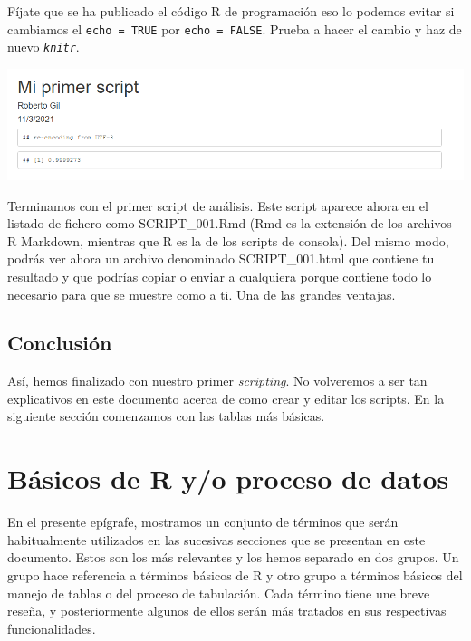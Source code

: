 \documentclass[
]{book}
\begin{document}
Fíjate que se ha publicado el código R de programación eso lo podemos evitar si cambiamos el \texttt{echo\ =\ TRUE} por \texttt{echo\ =\ FALSE}. Prueba a hacer el cambio y haz de nuevo \emph{\texttt{knitr}}.

\includegraphics{data/RS13.png}

Terminamos con el primer script de análisis. Este script aparece ahora en el listado de fichero como SCRIPT\_001.Rmd (Rmd es la extensión de los archivos R Markdown, mientras que R es la de los scripts de consola). Del mismo modo, podrás ver ahora un archivo denominado SCRIPT\_001.html que contiene tu resultado y que podrías copiar o enviar a cualquiera porque contiene todo lo necesario para que se muestre como a ti. Una de las grandes ventajas.

\hypertarget{conclusiuxf3n}{%
\subsection{Conclusión}\label{conclusiuxf3n}}

Así, hemos finalizado con nuestro primer \emph{scripting}. No volveremos a ser tan explicativos en este documento acerca de como crear y editar los scripts. En la siguiente sección comenzamos con las tablas más básicas.

\hypertarget{buxe1sicos-de-r-yo-proceso-de-datos}{%
\section{Básicos de R y/o proceso de datos}\label{buxe1sicos-de-r-yo-proceso-de-datos}}

En el presente epígrafe, mostramos un conjunto de términos que serán habitualmente utilizados en las sucesivas secciones que se presentan en este documento. Estos son los más relevantes y los hemos separado en dos grupos. Un grupo hace referencia a términos básicos de R y otro grupo a términos básicos del manejo de tablas o del proceso de tabulación. Cada término tiene une breve reseña, y posteriormente algunos de ellos serán más tratados en sus respectivas funcionalidades.
\end{document}
